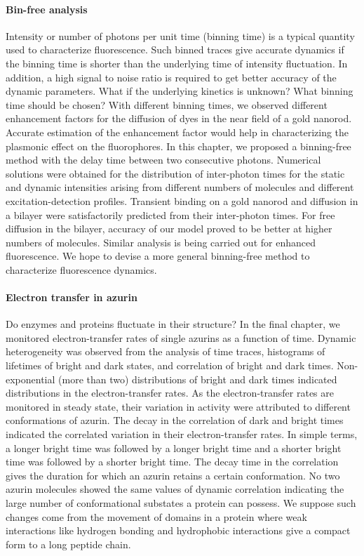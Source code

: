 \paragraph*{Bin-free analysis}
Intensity or number of photons per unit time (binning time) is a typical quantity used to characterize fluorescence.
Such binned traces give accurate dynamics if the binning time is shorter than the underlying time of intensity fluctuation.
In addition, a high signal to noise ratio is required to get better accuracy of the dynamic parameters.
What if the underlying kinetics is unknown? What binning time should be chosen?
With different binning times, we observed different enhancement factors for the diffusion of dyes in the near field of a gold nanorod.
Accurate estimation of the enhancement factor would help in characterizing the plasmonic effect on the fluorophores.
In this chapter, we proposed a binning-free method with the delay time between two consecutive photons.
Numerical solutions were obtained for the distribution of inter-photon times for the static and dynamic intensities arising from different numbers of molecules and different excitation-detection profiles.
Transient binding on a gold nanorod and diffusion in a bilayer were satisfactorily predicted from their inter-photon times.
For free diffusion in the bilayer, accuracy of our model proved to be better at higher numbers of molecules.
Similar analysis is being carried out for enhanced fluorescence.
We hope to devise a more general binning-free method to characterize fluorescence dynamics.


\paragraph*{Electron transfer in azurin}
Do enzymes and proteins fluctuate in their structure? In the final chapter, we monitored electron-transfer rates of single azurins as a function of time.
Dynamic heterogeneity was observed from the analysis of time traces, histograms of lifetimes of bright and dark states, and correlation of bright and dark times.
Non-exponential (more than two) distributions of bright and dark times indicated distributions in the electron-transfer rates.
As the electron-transfer rates are monitored in steady state, their variation in activity were attributed to different conformations of azurin.
The decay in the correlation of dark and bright times indicated the correlated variation in their electron-transfer rates.
In simple terms, a longer bright time was followed by a longer bright time and a shorter bright time was followed by a shorter bright time.
The decay time in the correlation gives the duration for which an azurin retains a certain conformation.
No two azurin molecules showed the same values of dynamic correlation indicating the large number of conformational substates a protein can possess.
We suppose such changes come from the movement of domains in a protein where weak interactions like hydrogen bonding and hydrophobic interactions give a compact form to a long peptide chain. 


